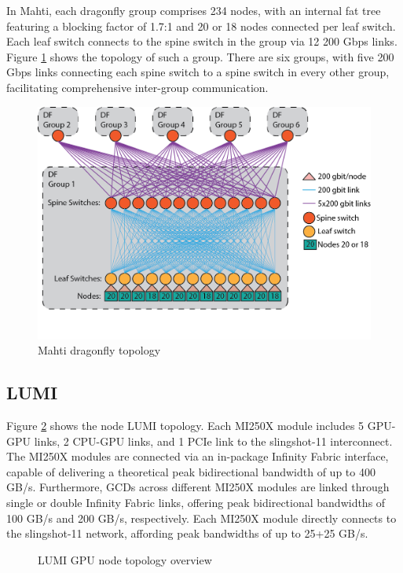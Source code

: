 In Mahti, each dragonfly group comprises 234 nodes, with an internal fat tree featuring a blocking factor of 1.7:1 and 20 or 18 nodes connected per leaf switch. Each leaf switch connects to the spine switch in the group via 12 200 Gbps links. Figure \ref{fig_mahti_df} shows the topology of such a group. There are six groups, with five 200 Gbps links connecting each spine switch to a spine switch in every other group, facilitating comprehensive inter-group communication.

\begin{figure}[H]
    \centering
    \includegraphics[width=1\textwidth]{figures/mahti_df.png}
    \caption{Mahti dragonfly topology \cite{mahti}}
    \label{fig_mahti_df}
\end{figure}

\subsection{LUMI}
Figure \ref{fig_lumig_topology} shows the node LUMI topology. Each MI250X module includes 5 GPU-GPU links, 2 CPU-GPU links, and 1 PCIe link to the slingshot-11 interconnect. The MI250X modules are connected via an in-package Infinity Fabric interface, capable of delivering a theoretical peak bidirectional bandwidth of up to 400 GB/s. Furthermore, GCDs across different MI250X modules are linked through single or double Infinity Fabric links, offering peak bidirectional bandwidths of 100 GB/s and 200 GB/s, respectively. Each MI250X module directly connects to the slingshot-11 network, affording peak bandwidths of up to 25+25 GB/s. 

\begin{figure}[H]
    \centering
    \caption{LUMI GPU node topology overview \cite{lumi}}
    \label{fig_lumig_topology}
\end{figure}


